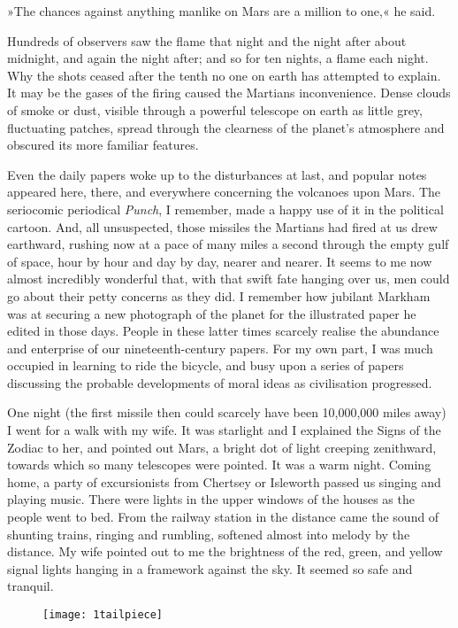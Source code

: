 »The chances against anything manlike on Mars are a million to one,« he said.

Hundreds of observers saw the flame that night and the night after about midnight, and again the night after; and so for ten nights, a flame each night. Why the shots ceased after the tenth no one on earth has attempted to explain. It may be the gases of the firing caused the Martians inconvenience. Dense clouds of smoke or dust, visible through a powerful telescope on earth as little grey, fluctuating patches, spread through the clearness of the planet's atmosphere and obscured its more familiar features.

Even the daily papers woke up to the disturbances at last, and popular notes appeared here, there, and everywhere concerning the volcanoes upon Mars. The seriocomic periodical \textit{Punch}, I remember, made a happy use of it in the political cartoon. And, all unsuspected, those missiles the Martians had fired at us drew earthward, rushing now at a pace of many miles a second through the empty gulf of space, hour by hour and day by day, nearer and nearer. It seems to me now almost incredibly wonderful that, with that swift fate hanging over us, men could go about their petty concerns as they did. I remember how jubilant Markham was at securing a new photograph of the planet for the illustrated paper he edited in those days. People in these latter times scarcely realise the abundance and enterprise of our nineteenth-century papers. For my own part, I was much occupied in learning to ride the bicycle, and busy upon a series of papers discussing the probable developments of moral ideas as civilisation progressed.

One night (the first missile then could scarcely have been 10,000,000 miles away) I went for a walk with my wife. It was starlight and I explained the Signs of the Zodiac to her, and pointed out Mars, a bright dot of light creeping zenithward, towards which so many telescopes were pointed. It was a warm night. Coming home, a party of excursionists from Chertsey or Isleworth passed us singing and playing music. There were lights in the upper windows of the houses as the people went to bed. From the railway station in the distance came the sound of shunting trains, ringing and rumbling, softened almost into melody by the distance. My wife pointed out to me the brightness of the red, green, and yellow signal lights hanging in a framework against the sky. It seemed so safe and tranquil.

\begin{figure}[b!]
\centering
\texttt{[image: 1tailpiece]}
\end{figure}